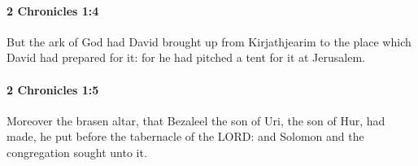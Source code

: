 		\paragraph{2 Chronicles 1:4} %
			\label{2CHRONICLES-1-4}

			But the ark of God had David brought up from Kirjathjearim to the place which David had prepared for it: for he had pitched a tent for it at Jerusalem.


		\paragraph{2 Chronicles 1:5} %
			\label{2CHRONICLES-1-5}

			Moreover the brasen altar, that Bezaleel the son of Uri, the son of Hur, had made, he put before the tabernacle of the LORD: and Solomon and the congregation sought unto it.


